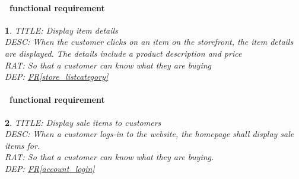 \documentclass{scrreprt}
\theoremstyle{funreq}
\newtheorem{funreq}{}
\newcommand*{\reqref}[1]{\hyperref[#1]{FR\ref*{#1}}}
\begin{document}
\paragraph[]{\Subsectionname ~functional requirement }
\begin{funreq}
	\label{store_details}
	TITLE: Display item details\\
	DESC: When the customer clicks on an item on the storefront, the item details are displayed.  The details include a product description and price\\
	RAT: So that a customer can know what they are buying\\
	DEP: \reqref{store_listcategory}\\
\end{funreq}

\paragraph[]{\Subsectionname ~functional requirement }
\begin{funreq}
	\label{store_displaysales}
	TITLE: Display sale items to customers\\
	DESC: When a customer logs-in to the website, the homepage shall display sale items for.\\
	RAT: So that a customer can know what they are buying.\\
	DEP: \reqref{account_login}\\
\end{funreq}

\end{document}
